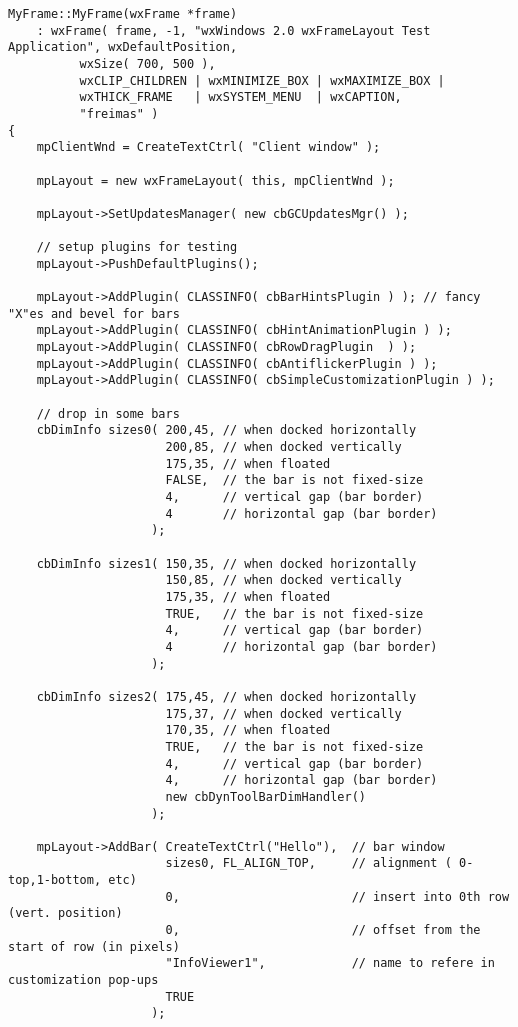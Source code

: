\begin{verbatim}
MyFrame::MyFrame(wxFrame *frame)
    : wxFrame( frame, -1, "wxWindows 2.0 wxFrameLayout Test Application", wxDefaultPosition, 
          wxSize( 700, 500 ), 
          wxCLIP_CHILDREN | wxMINIMIZE_BOX | wxMAXIMIZE_BOX | 
          wxTHICK_FRAME   | wxSYSTEM_MENU  | wxCAPTION, 
          "freimas" )
{
    mpClientWnd = CreateTextCtrl( "Client window" );
    
    mpLayout = new wxFrameLayout( this, mpClientWnd );
    
    mpLayout->SetUpdatesManager( new cbGCUpdatesMgr() );
    
    // setup plugins for testing
    mpLayout->PushDefaultPlugins();
    
    mpLayout->AddPlugin( CLASSINFO( cbBarHintsPlugin ) ); // fancy "X"es and bevel for bars
    mpLayout->AddPlugin( CLASSINFO( cbHintAnimationPlugin ) );
    mpLayout->AddPlugin( CLASSINFO( cbRowDragPlugin  ) );
    mpLayout->AddPlugin( CLASSINFO( cbAntiflickerPlugin ) );
    mpLayout->AddPlugin( CLASSINFO( cbSimpleCustomizationPlugin ) );
    
    // drop in some bars
    cbDimInfo sizes0( 200,45, // when docked horizontally      
                      200,85, // when docked vertically        
                      175,35, // when floated                  
                      FALSE,  // the bar is not fixed-size
                      4,      // vertical gap (bar border)
                      4       // horizontal gap (bar border)
                    ); 
    
    cbDimInfo sizes1( 150,35, // when docked horizontally      
                      150,85, // when docked vertically        
                      175,35, // when floated                  
                      TRUE,   // the bar is not fixed-size
                      4,      // vertical gap (bar border)
                      4       // horizontal gap (bar border)
                    ); 
    
    cbDimInfo sizes2( 175,45, // when docked horizontally      
                      175,37, // when docked vertically        
                      170,35, // when floated                  
                      TRUE,   // the bar is not fixed-size
                      4,      // vertical gap (bar border)
                      4,      // horizontal gap (bar border)
                      new cbDynToolBarDimHandler()
                    ); 
    
    mpLayout->AddBar( CreateTextCtrl("Hello"),  // bar window
                      sizes0, FL_ALIGN_TOP,     // alignment ( 0-top,1-bottom, etc)
                      0,                        // insert into 0th row (vert. position)
                      0,                        // offset from the start of row (in pixels)
                      "InfoViewer1",            // name to refere in customization pop-ups
                      TRUE
                    );
    

\end{verbatim}
